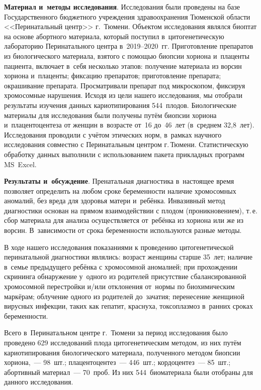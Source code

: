 \textbf{Материал и~методы исследования}. Исследования были проведены на базе Государственного бюджетного учреждения здравоохранения Тюменской области <<Перинатальный центр>> г.~Тюмени. Объектом исследования являлся биоптат на основе абортного материала, который поступил в~цитогенетическую лабораторию Перинатального центра в~2019--2020~гг. Приготовление препаратов из биологического материала, взятого с помощью биопсии хориона и~плаценты пациента, включает в~себя несколько этапов: получение материала из ворсин хориона и~плаценты; фиксацию препаратов; приготовление препарата; окрашивание препарата. Просматривали препарат под микроскопом, фиксируя хромосомные нарушения. Исходя из цели нашего исследования, мы отобрали результаты изучения данных кариотипирования 544~плодов. Биологические материалы для исследования были получены путём биопсии хориона и~плацентоцентеза от женщин в~возрасте от~16 до~46~лет (в~среднем 32,8~лет).  Исследования проводили с учётом этических норм, в~рамках научного исследования совместно с Перинатальным центром г.\,Тюмени. Статистическую обработку данных выполнили с использованием пакета прикладных программ MS~Excel.

\textbf{Результаты и~обсуждение}. Пренатальная диагностика в~настоящее время позволяет определить на любом сроке беременности наличие хромосомных аномалий, без вреда для здоровья матери и~ребёнка. Инвазивный метод диагностики основан на прямом взаимодействии с плодом (проникновением), т.\,е. сбор материала для анализа осуществляется от~ребёнка из хориона или же из ворсин. В~зависимости от срока беременности используются разные методы.

В ходе нашего исследования показаниями к проведению цитогенетической перинатальной диагностики являлись: возраст женщины старше 35~лет; наличие в~семье предыдущего ребёнка с хромосомной аномалией; при прохождении скрининга обнаружение у~одного из родителей присутствие сбалансированной хромосомной перестройки и/или отклонения от~нормы по биохимическим маркёрам; облучение одного из родителей до~зачатия; перенесение женщиной вирусных инфекции, таких как гепатит, краснуха, токсоплазмоз в~ранних сроках беременности.

Всего в~Перинатальном центре г.~Тюмени за период исследования было проведено 629 исследований плода цитогенетическим методом, из них путём кариотипирования биологического материала, полученного методом биопсии хориона,~--- 98~шт.; плацентоцентез~--- 446~шт.; кордоцентез~--- 85~шт.; абортивный материал~--- 70~проб. Из них 544~биоматериала были отобраны для данного исследования.

